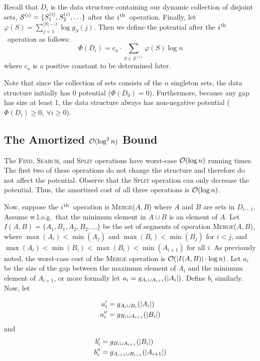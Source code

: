 \documentclass[11pt]{article}
\newcommand{\ens}[1]{\ensuremath{#1}}
\newcommand{\ith}{\ens{i^{\mbox{\hspace{.2mm}\scriptsize th}}}}
\newcommand{\kwMs}{Make-Set}
\newcommand{\kwSpl}{Split}
\newcommand{\kwUnion}{Merge}
\newcommand{\kwSrc}{Search}
\newcommand{\kwFind}{Find}
\newcommand{\Ms}{\mbox{\textsc{\kwMs}}}
\newcommand{\Spl}{\mbox{\textsc{\kwSpl}}}
\newcommand{\Union}{\mbox{\textsc{\kwUnion{}}}}
\newcommand{\Unionx}[2]{\mbox{\textsc{\kwUnion(\ensuremath{#1,#2})}}}
\newcommand{\Src}{\mbox{\textsc{\kwSrc}}}
\newcommand{\Find}{\mbox{\textsc{\kwFind}}}
\newcommand{\opcountmonetext}{three}
\newcommand{\opcountmtwotext}{two}
\newcommand{\segments}{{\segment}s}
\newcommand{\segment}{segment}
\newcommand{\cons}[1]{\ensuremath{c_{#1}}}
\newcommand{\cnsa}{\cons a}
\newcommand{\intmax}[1]{\ensuremath{\max(\intl #1)}}
\newcommand{\intmin}[1]{\ensuremath{\min(\intl #1)}}
\newcommand{\intsubs}[2]{\ensuremath{I(\set{#1},\set{#2})}}
\newcommand{\intnum}[2]{\ensuremath{|I(\set{#1},\set{#2})|}}
\newcommand{\intl}[1]{\ensuremath{#1}}
\newcommand{\set}[1]{\ensuremath{#1}}
\newcommand{\collection}[1]{\ensuremath{\mathcal #1}}
\newcommand{\numgap}[2]{\ensuremath{g_{\set #1}(#2)}}
\newcommand{\agap}[1]{\ensuremath{a_{#1}}}
\newcommand{\leftofa}[1]{\ensuremath{a_{#1}'}}
\newcommand{\rightofa}[1]{\ensuremath{a_{#1}''}}
\newcommand{\bgap}[1]{\ensuremath{b_{#1}}}
\newcommand{\leftofb}[1]{\ensuremath{b_{#1}'}}
\newcommand{\rightofb}[1]{\ensuremath{b_{#1}''}}
\newcommand{\datast}[1]{\ensuremath{D_{#1}}}
\newcommand{\hide}[1]{}
\newcommand{\potfun}[1]{\ensuremath{\Phi(#1)}}
\newcounter{count}
\begin{document}
Recall that $D_i$ is the data structure containing our dynamic collection of disjoint sets, ${\cal S}^{(i)} = \{S_1^{(i)}, S_2^{(i)},\ldots\}$ after the \ith\ operation. Finally, let $\varphi(S) = \sum_{j=1}^{|S|-1} \log \numgap{S}{j}$. Then we define the potential after the \ith\ operation as follows: 
\[ 
\potfun{\datast i} = \cnsa\cdot\sum_{\set S \in \collection{S^{(i)}}} \varphi\left(S\right)\log n 
\] 
where \cnsa{} is a positive constant to be determined later. 
  
Note that since the collection of sets consists of the $n$ singleton sets, the data structure initially has 0 potential ($\potfun{\datast 0}=0$). Furthermore, because any gap has size at least 1, the data structure always has non-negative potential ($\potfun{\datast i} \geq 0,\ \forall i\geq 0$). 



\subsection{The Amortized ${\cal O}(\log^2 n)$ Bound} 
\label{subsec:LogSQBound} 

The \hide{\Ms{}, }\Find{}, \Src{}, and \Spl{} operations have worst-case ${\cal O}(\log n)$ running times. The first \opcountmtwotext{} of these operations do not change the structure and therefore do not affect the potential. Observe that the \Spl{} operation can only decrease the potential. Thus, the amortized cost of all \opcountmonetext{} operations is ${\cal O}(\log n)$. 

Now, suppose the \ith\ operation is \Unionx{A}{B} where \set $A$ and \set $B$ are sets in \datast{i-1}. Assume w.l.o.g.~that the minimum element in $\set A\cup \set B$ is an element of \set $A$. Let $\intsubs{A}{B} = \{\intl A_1, \intl B_1, \intl A_2, \intl B_2,\ldots \}$ be the set of \segments{} of operation \Unionx{A}{B}, where $\intmax{A_i} < \intmin{A_j}$ and $\intmax{B_i} < \intmin{B_j}$ for $i<j$, and $\intmax{A_i}<\intmin{B_i}<\intmax{B_i}<\intmin{A_{i+1}}$ for all $i$. 
As previously noted, the worst-case cost of the \Union{} operation is ${\cal O}(\intnum{A}{B}\cdot\log n)$. Let $\agap i$ be the size of the gap between the maximum element of $\intl A_i$ and the minimum element of $\intl A_{i+1}$, or more formally let $\agap i = \numgap{\intl A_i \cup \intl A_{i+1}}{|\intl A_i|}$. Define $\bgap i$ similarly. Now, let 
 
 
\begin{align*} 
\leftofa{i} &= \numgap{\intl A_i \cup \intl B_{i}}{|\intl A_i|}\\ 
\rightofa{i} &= \numgap{\intl B_i \cup \intl A_{i+1}}{|\intl B_i|} 
\end{align*} 
and 
\begin{align*} 
\leftofb{i} &= \numgap{\intl B_i \cup \intl A_{i+1}}{|\intl B_i|}\\ 
\rightofb{i} &= \numgap{\intl A_{i+1} \cup \intl B_{i+1}}{|\intl A_{i+1}|} 
\end{align*} 
 
\end{document}
